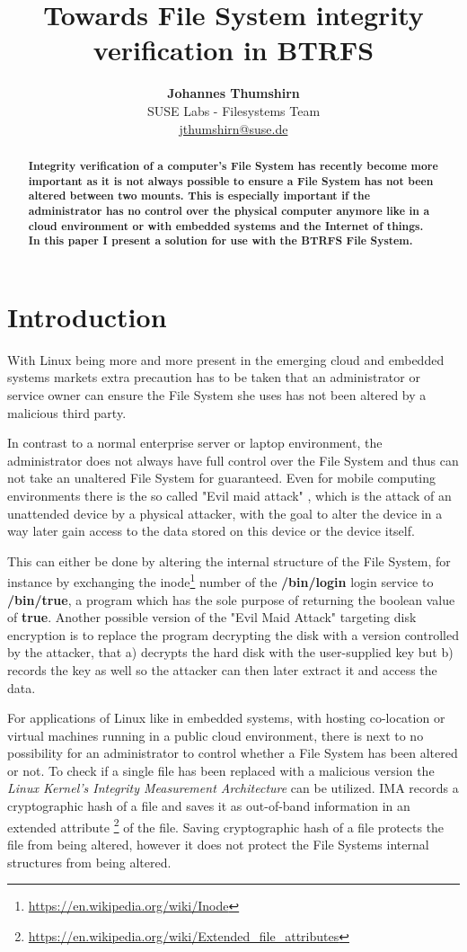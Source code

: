 \documentclass[10pt]{article}
\title{\textbf{Towards File System integrity verification in BTRFS}}
\author{
	\textbf{Johannes Thumshirn}\\
	\normalsize SUSE Labs - Filesystems Team\\
	\normalsize \href{mailto:jthumshirn@suse.de}{jthumshirn@suse.de}
}
\date{}
\begin{document}
\maketitle

\begin{abstract}
	\textbf{
	Integrity verification of a computer's File System has recently become
	more important as it is not always possible to ensure a File System
	has not been altered between two mounts. This is especially important
	if the administrator has no control over the physical computer anymore
	like in a cloud environment or with embedded systems and the Internet
	of things.
	\\In this paper I present a solution for use with the BTRFS File System.}
\end{abstract}
\section{Introduction} 
With Linux being more and more present in the emerging cloud and embedded
systems markets extra precaution has to be taken that an administrator or
service owner can ensure the File System she uses has not been altered by a
malicious third party.

In contrast to a normal enterprise server or laptop environment, the
administrator does not always have full control over the File System and thus
can not take an unaltered File System for guaranteed.  Even for mobile
computing environments there is the so called "Evil maid attack" \cite{maid},
which is the attack of an unattended device by a physical attacker, with the
goal to alter the device in a way later gain access to the data stored on this
device or the device itself.

This can either be done by altering the internal structure of the File System,
for instance by exchanging the
inode\footnote{\href{https://en.wikipedia.org/wiki/Inode}
{https://en.wikipedia.org/wiki/Inode}} number of the \textbf{/bin/login} login
service to \textbf{/bin/true}, a program which has the sole purpose of
returning the boolean value of \textbf{true}. Another possible version of the
"Evil Maid Attack" targeting disk encryption is to replace the program
decrypting the disk with a version controlled by the attacker, that a)
decrypts the hard disk with the user-supplied key but b) records the key as
well so the attacker can then later extract it and access the data.

For applications of Linux like in embedded systems, with hosting co-location
or virtual machines running in a public cloud environment, there is next to no
possibility for an administrator to control whether a File System has been
altered or not. To check if a single file has been replaced with a malicious
version the \textit{Linux Kernel's Integrity Measurement
Architecture}\cite{IMA} can be utilized. IMA records a cryptographic hash of a
file and saves it as out-of-band information in an extended attribute
\footnote{\href{https://en.wikipedia.org/wiki/Extended\_file\_attributes}
{https://en.wikipedia.org/wiki/Extended\_file\_attributes}} of the file.
Saving cryptographic hash of a file protects the file from being altered,
however it does not protect the File Systems internal structures from being
altered.
\end{document}
